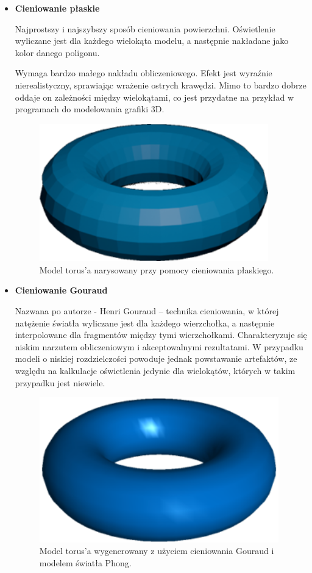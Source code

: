 \begin{itemize}
	\item \textbf{Cieniowanie płaskie}

	Najprostszy i najszybszy sposób cieniowania powierzchni. Oświetlenie wyliczane jest dla każdego wielokąta modelu, a następnie nakładane jako kolor danego poligonu.
	
	Wymaga bardzo małego nakładu obliczeniowego. Efekt jest wyraźnie nierealistyczny, sprawiając wrażenie ostrych krawędzi. Mimo to bardzo dobrze oddaje on zależności między wielokątami, co jest przydatne na przykład w programach do modelowania grafiki 3D.

	\begin{figure}[htbp]
		\centering
		\includegraphics[width=3.90833in,height=2.34916in]{images/3_flat_shading_torus.png}
		\caption{Model torus'a narysowany przy pomocy cieniowania płaskiego.}
	\end{figure}

	\item \textbf{Cieniowanie Gouraud}
	
	Nazwana po autorze - Henri Gouraud -- technika cieniowania, w której natężenie światła wyliczane jest dla każdego wierzchołka, a następnie interpolowane dla fragmentów między tymi wierzchołkami. Charakteryzuje się niskim narzutem obliczeniowym i akceptowalnymi rezultatami. W przypadku modeli o niskiej rozdzielczości powoduje jednak powstawanie artefaktów, ze względu na kalkulacje oświetlenia jedynie dla wielokątów, których w takim przypadku jest niewiele.

	\begin{figure}[htbp]
		\centering
		\includegraphics[width=4.08511in,height=2.475in]{images/4_gouraud_shading_torus.png}
		\caption{Model torus'a wygenerowany z użyciem cieniowania Gouraud i modelem światła Phong. \cite{wiki:gouraud:2024}}
	\end{figure}
	

\end{itemize}
